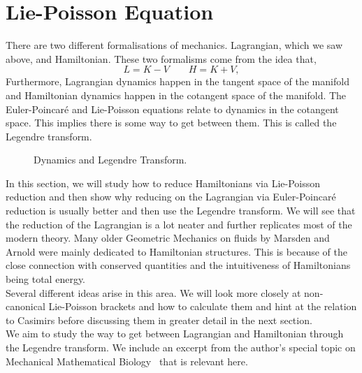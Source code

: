 
\section{Lie-Poisson Equation}
There are two different formalisations of mechanics. Lagrangian, which we saw above, and Hamiltonian. These two formalisms come from the idea that,
$$ L = K - V \qquad H = K + V, $$
Furthermore, Lagrangian dynamics happen in the tangent space of the manifold and Hamiltonian dynamics happen in the cotangent space of the manifold. The Euler-Poincar\'e and Lie-Poisson equations relate to dynamics in the cotangent space. This implies there is some way to get between them. This is called the Legendre transform.
\begin{figure}[!ht]
\centering
{}\vspace{-20pt}
\caption{Dynamics and Legendre Transform.}
\label{fig:diffeos}
\end{figure}

\noindent
In this section, we will study how to reduce Hamiltonians via Lie-Poisson reduction and then show why reducing on the Lagrangian via Euler-Poincar\'e reduction is usually better and then use the Legendre transform. We will see that the reduction of the Lagrangian is a lot neater and further replicates most of the modern theory. Many older Geometric Mechanics on fluids by Marsden and Arnold were mainly dedicated to Hamiltonian structures. This is because of the close connection with conserved quantities and the intuitiveness of Hamiltonians being total energy.\\

\noindent
Several different ideas arise in this area. We will look more closely at non-canonical Lie-Poisson brackets and how to calculate them and hint at the relation to Casimirs before discussing them in greater detail in the next section.\\

\noindent
We aim to study the way to get between Lagrangian and Hamiltonian through the Legendre transform. We include an excerpt from the author's special topic on Mechanical Mathematical Biology~\cite{arthur_mmb} that is relevant here.\\

